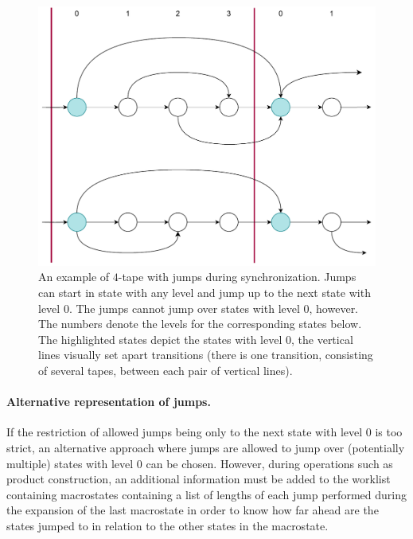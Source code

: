 \begin{figure}[ht]
  \centering
  \includegraphics[scale=0.5, keepaspectratio]{obrazky-figures/jumps_synchronization.drawio.pdf}
  \caption{
    An example of $4$-tape \nfts with jumps during synchronization.
    Jumps can start in state with any level and jump up to the next state with level $0$.
    The jumps cannot jump over states with level $0$, however.
    The numbers denote the levels for the corresponding states below.
    The highlighted states depict the states with level $0$, the vertical lines visually set apart \nft transitions (there is one \nft transition, consisting of several tapes, between each pair of vertical lines).
  }
  \label{fig:synchronization_jumps}

\end{figure}

\paragraph{Alternative representation of jumps.}
If the restriction of allowed jumps being only to the next state with level $0$ is too strict, an alternative approach where jumps are allowed to jump over (potentially multiple) states with level $0$ can be chosen.
However, during operations such as product construction, an additional information must be added to the worklist containing macrostates containing a list of lengths of each jump performed during the expansion of the last macrostate in order to know how far ahead are the states jumped to in relation to the other states in the macrostate.

